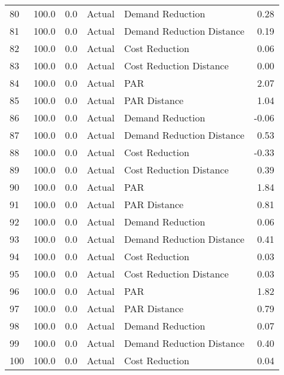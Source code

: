 \begin{longtable}{lrrllr}
80   &        100.0 &     0.0 &         Actual &           Demand Reduction &   0.28 \\
81   &        100.0 &     0.0 &         Actual &  Demand Reduction Distance &   0.19 \\
82   &        100.0 &     0.0 &         Actual &             Cost Reduction &   0.06 \\
83   &        100.0 &     0.0 &         Actual &    Cost Reduction Distance &   0.00 \\
84   &        100.0 &     0.0 &         Actual &                        PAR &   2.07 \\
85   &        100.0 &     0.0 &         Actual &               PAR Distance &   1.04 \\
86   &        100.0 &     0.0 &         Actual &           Demand Reduction &  -0.06 \\
87   &        100.0 &     0.0 &         Actual &  Demand Reduction Distance &   0.53 \\
88   &        100.0 &     0.0 &         Actual &             Cost Reduction &  -0.33 \\
89   &        100.0 &     0.0 &         Actual &    Cost Reduction Distance &   0.39 \\
90   &        100.0 &     0.0 &         Actual &                        PAR &   1.84 \\
91   &        100.0 &     0.0 &         Actual &               PAR Distance &   0.81 \\
92   &        100.0 &     0.0 &         Actual &           Demand Reduction &   0.06 \\
93   &        100.0 &     0.0 &         Actual &  Demand Reduction Distance &   0.41 \\
94   &        100.0 &     0.0 &         Actual &             Cost Reduction &   0.03 \\
95   &        100.0 &     0.0 &         Actual &    Cost Reduction Distance &   0.03 \\
96   &        100.0 &     0.0 &         Actual &                        PAR &   1.82 \\
97   &        100.0 &     0.0 &         Actual &               PAR Distance &   0.79 \\
98   &        100.0 &     0.0 &         Actual &           Demand Reduction &   0.07 \\
99   &        100.0 &     0.0 &         Actual &  Demand Reduction Distance &   0.40 \\
100  &        100.0 &     0.0 &         Actual &             Cost Reduction &   0.04 \\

\end{longtable}
